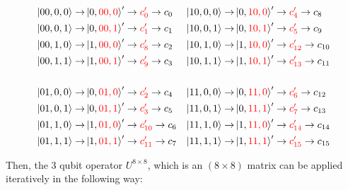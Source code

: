 \begin{align*}
\ket{00,0,0} \rightarrow & \ket{0,\color{red}00,0\color{black}}' \rightarrow \color{red}c'_{0}\color{black}\rightarrow c_{0} &
\ket{10,0,0} \rightarrow & \ket{0,\color{red}10,0\color{black}}' \rightarrow \color{red}c'_{4}\color{black}\rightarrow c_{8} \\
\ket{00,0,1} \rightarrow & \ket{0,\color{red}00,1\color{black}}' \rightarrow \color{red}c'_{1}\color{black}\rightarrow c_{1} &
\ket{10,0,1} \rightarrow & \ket{0,\color{red}10,1\color{black}}' \rightarrow \color{red}c'_{5}\color{black}\rightarrow c_{9} \\
\ket{00,1,0} \rightarrow & \ket{1,\color{red}00,0\color{black}}' \rightarrow \color{red}c'_{8}\color{black}\rightarrow c_{2} &
\ket{10,1,0} \rightarrow & \ket{1,\color{red}10,0\color{black}}' \rightarrow \color{red}c'_{12}\color{black}\rightarrow c_{10} \\
\ket{00,1,1} \rightarrow & \ket{1,\color{red}00,1\color{black}}' \rightarrow \color{red}c'_{9}\color{black}\rightarrow c_{3} &
\ket{10,1,1} \rightarrow & \ket{1,\color{red}10,1\color{black}}' \rightarrow \color{red}c'_{13}\color{black}\rightarrow c_{11} \\
\\
\ket{01,0,0} \rightarrow & \ket{0,\color{red}01,0\color{black}}' \rightarrow \color{red}c'_{2}\color{black}\rightarrow c_{4} &
\ket{11,0,0} \rightarrow & \ket{0,\color{red}11,0\color{black}}' \rightarrow \color{red}c'_{6}\color{black}\rightarrow c_{12} \\
\ket{01,0,1} \rightarrow & \ket{0,\color{red}01,1\color{black}}' \rightarrow \color{red}c'_{3}\color{black}\rightarrow c_{5} &
\ket{11,0,1} \rightarrow & \ket{0,\color{red}11,1\color{black}}' \rightarrow \color{red}c'_{7}\color{black}\rightarrow c_{13} \\
\ket{01,1,0} \rightarrow & \ket{1,\color{red}01,0\color{black}}' \rightarrow \color{red}c'_{10}\color{black}\rightarrow c_{6} &
\ket{11,1,0} \rightarrow & \ket{1,\color{red}11,0\color{black}}' \rightarrow \color{red}c'_{14}\color{black}\rightarrow c_{14} \\
\ket{01,1,1} \rightarrow & \ket{1,\color{red}01,1\color{black}}' \rightarrow \color{red}c'_{11}\color{black}\rightarrow c_{7} &
\ket{11,1,1} \rightarrow & \ket{1,\color{red}11,1\color{black}}' \rightarrow \color{red}c'_{15}\color{black}\rightarrow c_{15} \\
\end{align*}

Then, the 3 qubit operator $U^{8\times{}8}$, which is an $(8\times8)$ matrix can be applied iteratively in the following way:

